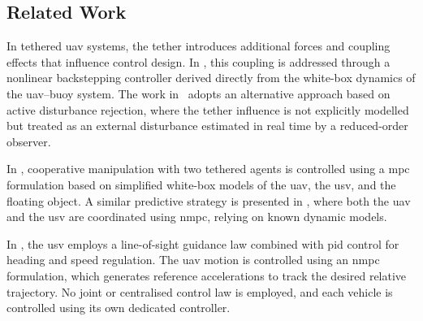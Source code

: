 \subsection{Related Work}

In tethered \gls{uav} systems, the tether introduces additional forces and coupling effects that influence control design. 
In \cite{kouraniMarineLocomotionTethered2021}, this coupling is addressed through a nonlinear backstepping controller derived directly from the white-box dynamics of the \gls{uav}--buoy system. 
The work in~\cite{yuReducedComplexityActiveDisturbance2023} adopts an alternative approach based on active disturbance rejection, where the tether influence is not explicitly modelled but treated as an external disturbance estimated in real time by a reduced-order observer. 

In \cite{novakCollaborativeObjectManipulation2024}, cooperative manipulation with two tethered agents is controlled using a \gls{mpc} formulation based on simplified white-box models of the \gls{uav}, the \gls{usv}, and the floating object. 
A similar predictive strategy is presented in \cite{liNMPCbasedUAVUSVCooperative2023}, where both the \gls{uav} and the \gls{usv} are coordinated using \gls{nmpc}, relying on known dynamic models.

In \cite{zhangCooperativeControlFramework2025}, the \gls{usv} employs a line-of-sight guidance law combined with \gls{pid} control for heading and speed regulation. The \gls{uav} motion is controlled using an \gls{nmpc} formulation, which generates reference accelerations to track the desired relative trajectory. No joint or centralised control law is employed, and each vehicle is controlled using its own dedicated controller.





